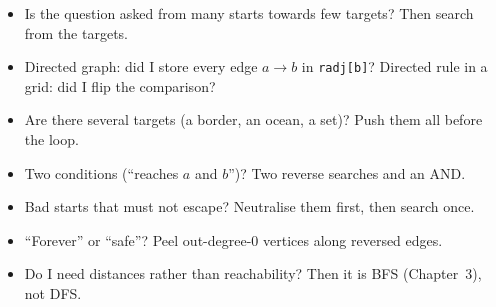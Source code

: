 \begin{checklistbox}
\begin{itemize}[leftmargin=*]
    \item[$\square$] Is the question asked from many starts towards few targets? Then search from the targets.
    \item[$\square$] Directed graph: did I store every edge $a \to b$ in \texttt{radj[b]}? Directed rule in a grid: did I flip the comparison?
    \item[$\square$] Are there several targets (a border, an ocean, a set)? Push them all before the loop.
    \item[$\square$] Two conditions (``reaches $a$ and $b$'')? Two reverse searches and an AND.
    \item[$\square$] Bad starts that must not escape? Neutralise them first, then search once.
    \item[$\square$] ``Forever'' or ``safe''? Peel out-degree-0 vertices along reversed edges.
    \item[$\square$] Do I need distances rather than reachability? Then it is BFS (Chapter~3), not DFS.
\end{itemize}
\end{checklistbox}

